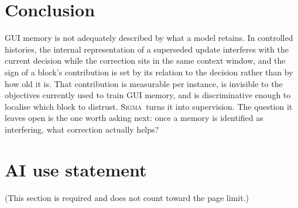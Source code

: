 \documentclass{article}
\newcommand{\method}{\textsc{Sigma}}
\begin{document}
\section{Conclusion}
\label{sec:conclusion}

GUI memory is not adequately described by what a model retains. In controlled
histories, the internal representation of a superseded update interferes with
the current decision while the correction sits in the same context window, and
the sign of a block's contribution is set by its relation to the decision rather
than by how old it is. That contribution is measurable per instance, is
invisible to the objectives currently used to train GUI memory, and is
discriminative enough to localise which block to distrust. \method\ turns it into
supervision. The question it leaves open is the one worth asking next: once a
memory is identified as interfering, what correction actually helps?

\label{main-text-end}

\clearpage
\section*{AI use statement}
(This section is required and does not count toward the page limit.)
\end{document}
